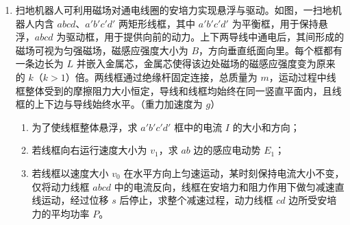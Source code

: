 \documentclass[\gkver]{gaokaozhenti}
\begin{document}
\begin{enumerate}
\item
扫地机器人可利用磁场对通电线圈的安培力实现悬浮与驱动。如图，一扫地机器人内含 $abcd$、$a'b'c'd'$ 两矩形线框，其中 $a'b'c'd'$ 为平衡框，用于保持悬浮，$abcd$ 为驱动框，用于提供向前的动力。上下两导线中通电后，其间形成的磁场可视为匀强磁场，磁感应强度大小为 $B$，方向垂直纸面向里。每个框都有一条边长为 $L$ 并嵌入金属芯，金属芯使得该边处磁场的磁感应强度变为原来的 $k$（$k>1$）倍。两线框通过绝缘杆固定连接，总质量为 $m$，运动过程中线框整体受到的摩擦阻力大小恒定，导线和线框均始终在同一竖直平面内，且线框的上下边与导线始终水平。（重力加速度为 $g$）
\begin{enumerate}
	\item
	为了使线框整体悬浮，求 $a'b'c'd'$ 框中的电流 $I$ 的大小和方向；
	\item
	若线框向右运行速度大小为 $v_{1}$，求 $ab$ 边的感应电动势 $E_{1}$；
	\item
	若线框以速度大小 $v_{0}$ 在水平方向上匀速运动，某时刻保持电流大小不变，仅将动力线框 $abcd$ 中的电流反向，线框在安培力和阻力作用下做匀减速直线运动，经过位移 $s$ 后停止，求整个减速过程，动力线框 $cd$ 边所受安培力的平均功率 $P$。
\end{enumerate}
\onepicture[w=9.0cm, align=right]{}
\end{enumerate}
\end{document}
